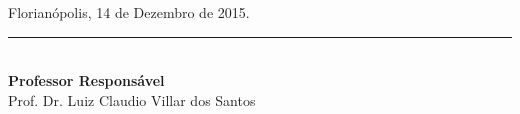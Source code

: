 \documentclass{ufsc-thesis} %
\begin{document}
\begin{anexosenv}
{\begin{tabular}{|l|X p{8cm}|}
	\end{tabular}
}

\vspace{40pt}

\begin{flushright}

	Florianópolis, 14 de Dezembro de 2015.

\end{flushright}

\vspace{20pt}


\begin{center}
 \parbox{7cm}{%
 \centering
   \rule{6cm}{1pt}\\
    \small \textbf{Professor Responsável}\\
    Prof. Dr. Luiz Claudio Villar dos Santos
 }
	\hfill
\end{center}

\end{anexosenv}
\end{document}
